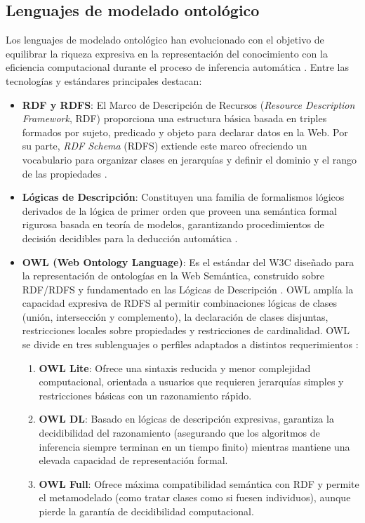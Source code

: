 \documentclass[12pt, letterpaper, oneside]{book}
\begin{document}
\subsection{Lenguajes de modelado ontológico} Los lenguajes de modelado ontológico han evolucionado con el objetivo de equilibrar la riqueza expresiva en la representación del conocimiento con la eficiencia computacional durante el proceso de inferencia automática \cite{Horrocks2003}. Entre las tecnologías y estándares principales destacan: 
\begin{itemize} 
	\item \textbf{RDF y RDFS}: El Marco de Descripción de Recursos (\textit{Resource Description Framework}, RDF) proporciona una estructura básica basada en triples formados por sujeto, predicado y objeto para declarar datos en la Web. Por su parte, \textit{RDF Schema} (RDFS) extiende este marco ofreciendo un vocabulario para organizar clases en jerarquías y definir el dominio y el rango de las propiedades \cite{Horrocks2003}. 
	\item \textbf{Lógicas de Descripción}: Constituyen una familia de formalismos lógicos derivados de la lógica de primer orden que proveen una semántica formal rigurosa basada en teoría de modelos, garantizando procedimientos de decisión decidibles para la deducción automática \cite{Horrocks2003}. 
	\item \textbf{OWL (Web Ontology Language)}: Es el estándar del W3C diseñado para la representación de ontologías en la Web Semántica, construido sobre RDF/RDFS y fundamentado en las Lógicas de Descripción \cite{Horrocks2003}. OWL amplía la capacidad expresiva de RDFS al permitir combinaciones lógicas de clases (unión, intersección y complemento), la declaración de clases disjuntas, restricciones locales sobre propiedades y restricciones de cardinalidad. OWL se divide en tres sublenguajes o perfiles adaptados a distintos requerimientos \cite{Horrocks2003}:
	\begin{enumerate} 
		\item \textbf{OWL Lite}: Ofrece una sintaxis reducida y menor complejidad computacional, orientada a usuarios que requieren jerarquías simples y restricciones básicas con un razonamiento rápido. 
		\item \textbf{OWL DL}: Basado en lógicas de descripción expresivas, garantiza la decidibilidad del razonamiento (asegurando que los algoritmos de inferencia siempre terminan en un tiempo finito) mientras mantiene una elevada capacidad de representación formal. 
		\item \textbf{OWL Full}: Ofrece máxima compatibilidad semántica con RDF y permite el metamodelado (como tratar clases como si fuesen individuos), aunque pierde la garantía de decidibilidad computacional.
	\end{enumerate} 
\end{itemize} 
\end{document}
